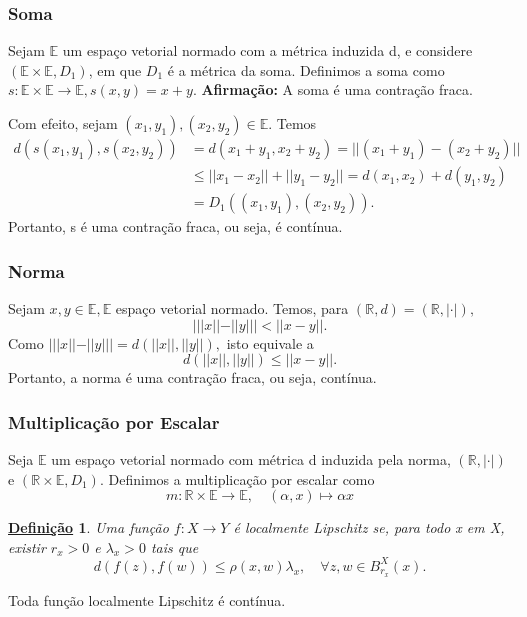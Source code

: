 \documentclass{article}
\newtheorem*{def*}{\underline{Defini\c c\~ao}}
\begin{document}
\subsubsection{Soma} 
  Sejam \(\mathbb{E}\) um espaço vetorial normado com a métrica induzida d, e considere
\((\mathbb{E}\times \mathbb{E}, D_{1})\), em que \(D_{1}\) é a métrica da soma. Definimos a soma como
\(s:\mathbb{E}\times \mathbb{E}\rightarrow \mathbb{E}, s(x, y) = x + y.\)
\textbf{Afirmação:} A soma é uma contração fraca.

  Com efeito, sejam \((x_{1}, y_{1}), (x_{2}, y_{2})\in \mathbb{E}.\) Temos
 \begin{align*}
   d(s(x_{1}, y_{1}), s(x_{2}, y_{2})) &= d(x_{1}+y_{1}, x_{2}+y_{2}) = ||(x_{1}+y_{1})-(x_{2}+y_{2})||\\
                                       &\leq ||x_{1}-x_{2}|| + ||y_{1}-y_{2}|| = d(x_{1}, x_{2}) + d(y_{1}, y_{2})\\
                                       &=D_{1}((x_{1}, y_{1}), (x_{2}, y_{2})).
 \end{align*}
Portanto, s é uma contração fraca, ou seja, é contínua.
\subsubsection{Norma}
  Sejam \(x, y\in \mathbb{E}, \mathbb{E}\) espaço vetorial normado. Temos, para \((\mathbb{R}, d)=(\mathbb{R}, |\cdot |),\)
    \[
      |||x||-||y||| < ||x-y||.
    \]
  Como \(|||x||-||y||| = d(||x||, ||y||),\) isto equivale a 
    \[
      d(||x||, ||y||)\leq ||x-y||.
    \]
  Portanto, a norma é uma contração fraca, ou seja, contínua.
\subsubsection{Multiplicação por Escalar}
  Seja \(\mathbb{E}\) um espaço vetorial normado com métrica d induzida pela norma, \((\mathbb{R}, |\cdot |)\) e \((\mathbb{R}\times \mathbb{E}, D_{1})\).
Definimos a multiplicação por escalar como 
  \[
    m:\mathbb{R}\times \mathbb{E}\rightarrow \mathbb{E},\quad (\alpha ,x)\mapsto \alpha x
  \]
\begin{def*}
  Uma função \(f:X\rightarrow Y\) é localmente Lipschitz se, para todo x em X, existir \(r_{x}>0\) e \(\lambda_{x}>0\) tais que 
    \[
      d(f(z), f(w))\leq \rho (x, w)\lambda_{x},\quad \forall z, w\in B_{r_{x}}^{X}(x).
    \]
\end{def*}
  Toda função localmente Lipschitz é contínua.
\end{document}
